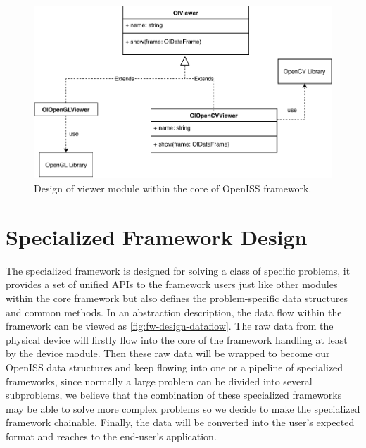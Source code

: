 \begin{figure}
    \centering
    \includegraphics[scale=0.8]{figures/framework_core_viewer.pdf}
    \caption{Design of viewer module within the core of OpenISS framework.}
    \label{fig:fw-core-viewer}
\end{figure}

\section{Specialized Framework Design}
\label{sec:fw-design-spec}

The specialized framework is designed for solving a class of specific problems,
it provides a set of unified APIs to the framework users just like other
modules within the core framework but also defines the problem-specific data
structures and common methods. In an abstraction description, the data flow
within the framework can be viewed as \autoref{fig:fw-design-dataflow}. The raw
data from the physical device will firstly flow into the core of the framework
handling at least by the device module. Then these raw data will be wrapped to
become our OpenISS data structures and keep flowing into one or a pipeline of
specialized frameworks, since normally a large problem can be divided into
several subproblems, we believe that the combination of these specialized
frameworks may be able to solve more complex problems so we decide to make the
specialized framework chainable. Finally, the data will be converted into the
user's expected format and reaches to the end-user's application.

